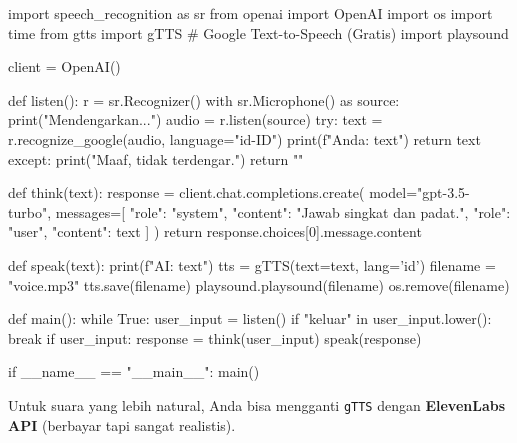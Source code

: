\begin{codeblock}[language=Python]
import speech_recognition as sr
from openai import OpenAI
import os
import time
from gtts import gTTS # Google Text-to-Speech (Gratis)
import playsound

client = OpenAI()

def listen():
    r = sr.Recognizer()
    with sr.Microphone() as source:
        print("Mendengarkan...")
        audio = r.listen(source)
        try:
            text = r.recognize_google(audio, language="id-ID")
            print(f"Anda: {text}")
            return text
        except:
            print("Maaf, tidak terdengar.")
            return ""

def think(text):
    response = client.chat.completions.create(
        model="gpt-3.5-turbo",
        messages=[
            {"role": "system", "content": "Jawab singkat dan padat."},
            {"role": "user", "content": text}
        ]
    )
    return response.choices[0].message.content

def speak(text):
    print(f"AI: {text}")
    tts = gTTS(text=text, lang='id')
    filename = "voice.mp3"
    tts.save(filename)
    playsound.playsound(filename)
    os.remove(filename)

def main():
    while True:
        user_input = listen()
        if "keluar" in user_input.lower():
            break
        if user_input:
            response = think(user_input)
            speak(response)

if __name__ == "__main__":
    main()
\end{codeblock}

\begin{tipbox}
Untuk suara yang lebih natural, Anda bisa mengganti \texttt{gTTS} dengan \textbf{ElevenLabs API} (berbayar tapi sangat realistis).
\end{tipbox}
